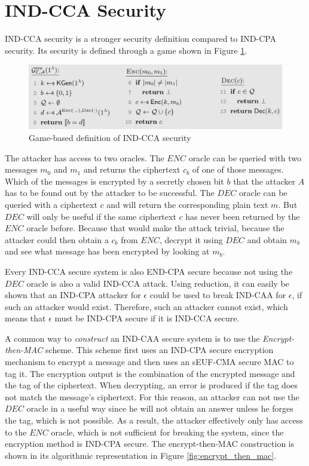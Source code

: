 \section{IND-CCA Security}\label{sec:IND_CCA}

IND-CCA security is a stronger security definition compared to IND-CPA security.
Its security is defined through a game shown in Figure \ref{fig:IND_CCA}.

\begin{figure}[H]
    \center
    \includegraphics[width=\linewidth]{gfx/IND_CCA.png}
    \caption{Game-based definition of IND-CCA security}
    \label{fig:IND_CCA}
\end{figure}

The attacker has access to two oracles.
The $ENC$ oracle can be queried with two messages $m_0$ and $m_1$ and returns the ciphertext $c_b$ of one of those messages.
Which of the messages is encrypted by a secretly chosen bit $b$ that the attacker $A$ has to be found out by the attacker to be successful.
The $DEC$ oracle can be queried with a ciphertext $c$ and will return the corresponding plain text $m$.
But $DEC$ will only be useful if the same ciphertext $c$ has never been returned by the $ENC$ oracle before.
Because that would make the attack trivial, because the attacker could then obtain a $c_b$ from $ENC$, decrypt it using $DEC$ and obtain $m_b$ and see what message has been encrypted by looking at $m_b$.

Every IND-CCA secure system is also END-CPA secure because not using the $DEC$ oracle is also a valid IND-CCA attack. Using reduction, it can easily be shown that an IND-CPA attacker for $\epsilon$ could be used to break IND-CAA for $\epsilon$, if such an attacker would exist. Therefore, such an attacker cannot exist, which means that $\epsilon$ must be IND-CPA secure if it is IND-CCA secure.

A common way to \emph{construct} an IND-CAA secure system is to use the \emph{Encrypt-then-MAC} scheme.
This scheme first uses an IND-CPA secure encryption mechanism to encrypt a message and then uses an sEUF-CMA secure MAC to tag it.
The encryption output is the combination of the encrypted message and the tag of the ciphertext.
When decrypting, an error is produced if the tag does not match the message's ciphertext.
For this reason, an attacker can not use the $DEC$ oracle in a useful way since he will not obtain an answer unless he forges the tag, which is not possible.
As a result, the attacker effectively only has access to the $ENC$ oracle, which is not sufficient for breaking the system, since the encryption method is IND-CPA secure.
The encrypt-then-MAC construction is shown in its algorithmic representation in Figure \ref{fig:encrypt_then_mac}.

